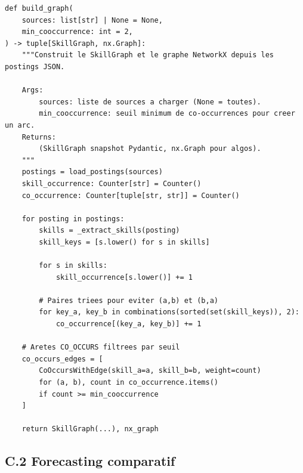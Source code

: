 \documentclass[11pt,a4paper,openany]{report}
\begin{document}
\begin{lstlisting}[caption={Extrait de \texttt{skillnav/pipelines/structure\_mining/graph\_builder.py}}]
def build_graph(
    sources: list[str] | None = None,
    min_cooccurrence: int = 2,
) -> tuple[SkillGraph, nx.Graph]:
    """Construit le SkillGraph et le graphe NetworkX depuis les postings JSON.

    Args:
        sources: liste de sources a charger (None = toutes).
        min_cooccurrence: seuil minimum de co-occurrences pour creer un arc.
    Returns:
        (SkillGraph snapshot Pydantic, nx.Graph pour algos).
    """
    postings = load_postings(sources)
    skill_occurrence: Counter[str] = Counter()
    co_occurrence: Counter[tuple[str, str]] = Counter()

    for posting in postings:
        skills = _extract_skills(posting)
        skill_keys = [s.lower() for s in skills]

        for s in skills:
            skill_occurrence[s.lower()] += 1

        # Paires triees pour eviter (a,b) et (b,a)
        for key_a, key_b in combinations(sorted(set(skill_keys)), 2):
            co_occurrence[(key_a, key_b)] += 1

    # Aretes CO_OCCURS filtrees par seuil
    co_occurs_edges = [
        CoOccursWithEdge(skill_a=a, skill_b=b, weight=count)
        for (a, b), count in co_occurrence.items()
        if count >= min_cooccurrence
    ]

    return SkillGraph(...), nx_graph
\end{lstlisting}

\subsection*{C.2 Forecasting comparatif}
\end{document}
